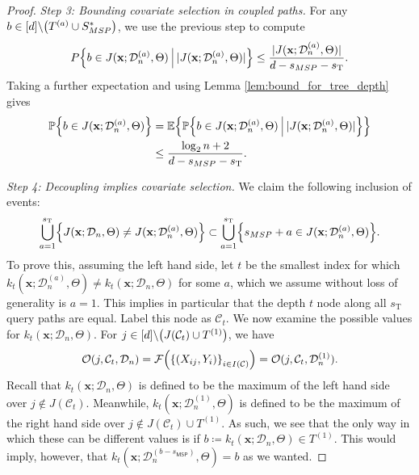 \documentclass[10pt,a4paper]{amsart}
\DeclarePairedDelimiter{\abs}{|}{|}
\DeclarePairedDelimiter{\braces}{\lbrace}{\rbrace}
\DeclarePairedDelimiter{\paren}{(}{)}
\newcommand{\E}{\mathbb{E}}
\newcommand{\MSP}{\textsf{MSP}}
\newcommand{\bx}{\mathbf{x}}
\newcommand{\cellfeatindices}{J}
\newcommand{\cell}{\mathcal{C}}
\newcommand{\coordindices}{[\nfeats]}
\newcommand{\data}[1][n]{\mathcal{D}_{#1}}
\newcommand{\nfeats}{d}
\newcommand{\nsamples}{n}
\newcommand{\sparsity}{s}
\newcommand{\suppset}{S^*}
\newcommand{\traversalsize}{\sparsity_{\operatorname{T}}}
\newcommand{\traversal}{T}
\renewcommand{\P}{\mathbb{P}}
\begin{document}
\begin{proof}
    \textit{Step 3: Bounding covariate selection in coupled paths.}
    For any $b \in \coordindices\backslash\paren*{\traversal^{(a)}\cup\suppset_{\MSP}}$, we use the previous step to compute
    \begin{equation}
        P\braces*{b \in J(\bx;\data^{(a)},\Theta)~\vline~\abs{J(\bx;\data^{(a)},\Theta)}} \leq \frac{\abs{J(\bx;\data^{(a)},\Theta)}}{\nfeats - \sparsity_{\MSP}-\traversalsize}.
    \end{equation}
    Taking a further expectation and using Lemma \ref{lem:bound_for_tree_depth} gives
    \begin{equation}
    \begin{split}
        \P\braces*{b \in J(\bx;\data^{(a)},\Theta)} & = \E\braces*{\P\braces*{b \in J(\bx;\data^{(a)},\Theta)~\vline~\abs{J(\bx;\data^{(a)},\Theta)}}} \\
        & \leq \frac{\log_2 \nsamples + 2}{\nfeats - \sparsity_{\MSP}-\traversalsize}.
    \end{split}
    \end{equation}

    \textit{Step 4: Decoupling implies covariate selection.}
    We claim the following inclusion of events:
    \begin{equation}
    \label{eq:non_msp_decoupling_covariate_selection}
        \bigcup_{a=1}^{\traversalsize}\braces*{J(\bx;\data,\Theta) \neq J(\bx;\data^{(a)},\Theta)} \subset \bigcup_{a=1}^{\traversalsize}\braces*{\sparsity_{\MSP} + a \in J(\bx;\data^{(a)},\Theta)}.
    \end{equation}
    To prove this, assuming the left hand side, let $t$ be the smallest index for which $k_t(\bx;\data^{(a)},\Theta) \neq k_t(\bx;\data,\Theta)$ for some $a$, which we assume without loss of generality is $a=1$.
    This implies in particular that the depth $t$ node along all $\traversalsize$ query paths are equal.
    Label this node as $\cell_t$.
    We now examine the possible values for $k_t(\bx;\data,\Theta)$.
    For $j \in \coordindices\backslash\paren*{\cellfeatindices(\cell_t)\cup\traversal^{(1)}}$, we have
    \begin{equation}
        \mathcal{O}(j,\cell_t,\data) = \mathcal{F}\paren*{\braces*{(X_{ij},Y_i)}_{i \in I(\cell)}} = \mathcal{O}(j,\cell_t,\data^{(1)}).
    \end{equation}
    Recall that $k_t(\bx;\data,\Theta)$ is defined to be the maximum of the left hand side over $j \notin \cellfeatindices(\cell_t)$.
    Meanwhile, $k_t(\bx;\data^{(1)},\Theta)$ is defined to be the maximum of the right hand side over $j \notin \cellfeatindices(\cell_t)\cup\traversal^{(1)}$.
    As such, we see that the only way in which these can be different values is if $b\coloneqq k_t(\bx;\data,\Theta) \in \traversal^{(1)}$.
    This would imply, however, that $k_t(\bx;\data^{(b-\sparsity_{\MSP})},\Theta) = b$ as we wanted.


\end{proof}
\end{document}

